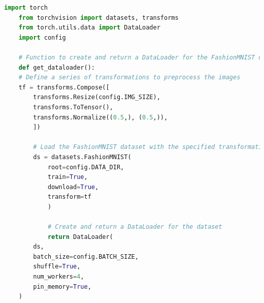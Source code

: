 \documentclass[11pt]{article}
\begin{document}
\begin{lstlisting}[language=Python, caption={DataLoader Class}, label={lst:config}, frame=single, basicstyle=\ttfamily\small, keywordstyle=\color{blue}\bfseries, commentstyle=\color{green!50!black}, stringstyle=\color{red!70!black}]
    import torch
    from torchvision import datasets, transforms
    from torch.utils.data import DataLoader
    import config
    
    # Function to create and return a DataLoader for the FashionMNIST dataset
    def get_dataloader():
    # Define a series of transformations to preprocess the images
    tf = transforms.Compose([
        transforms.Resize(config.IMG_SIZE),  
        transforms.ToTensor(),              
        transforms.Normalize((0.5,), (0.5,)),  
        ])
        
        # Load the FashionMNIST dataset with the specified transformations
        ds = datasets.FashionMNIST(
            root=config.DATA_DIR,  
            train=True,           
            download=True,        
            transform=tf          
            )
            
            # Create and return a DataLoader for the dataset
            return DataLoader(
        ds,
        batch_size=config.BATCH_SIZE,  
        shuffle=True,                  
        num_workers=4,                 
        pin_memory=True,               
    )
\end{lstlisting}
\end{document}
